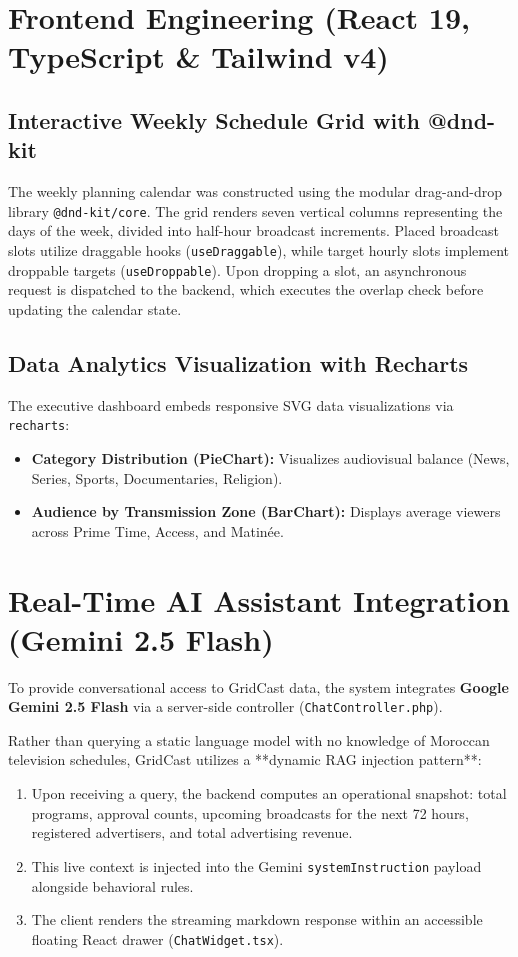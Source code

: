 \documentclass[12pt,a4paper,oneside]{report}
\begin{document}
\section{Frontend Engineering (React 19, TypeScript \& Tailwind v4)}

\subsection{Interactive Weekly Schedule Grid with @dnd-kit}
The weekly planning calendar was constructed using the modular drag-and-drop library \texttt{@dnd-kit/core}. The grid renders seven vertical columns representing the days of the week, divided into half-hour broadcast increments. Placed broadcast slots utilize draggable hooks (\texttt{useDraggable}), while target hourly slots implement droppable targets (\texttt{useDroppable}). Upon dropping a slot, an asynchronous request is dispatched to the backend, which executes the overlap check before updating the calendar state.

\subsection{Data Analytics Visualization with Recharts}
The executive dashboard embeds responsive SVG data visualizations via \texttt{recharts}:
\begin{itemize}
    \item \textbf{Category Distribution (PieChart):} Visualizes audiovisual balance (News, Series, Sports, Documentaries, Religion).
    \item \textbf{Audience by Transmission Zone (BarChart):} Displays average viewers across Prime Time, Access, and Matinée.
\end{itemize}

\section{Real-Time AI Assistant Integration (Gemini 2.5 Flash)}
To provide conversational access to GridCast data, the system integrates \textbf{Google Gemini 2.5 Flash} via a server-side controller (\texttt{ChatController.php}).

Rather than querying a static language model with no knowledge of Moroccan television schedules, GridCast utilizes a **dynamic RAG injection pattern**:
\begin{enumerate}
    \item Upon receiving a query, the backend computes an operational snapshot: total programs, approval counts, upcoming broadcasts for the next 72 hours, registered advertisers, and total advertising revenue.
    \item This live context is injected into the Gemini \texttt{systemInstruction} payload alongside behavioral rules.
    \item The client renders the streaming markdown response within an accessible floating React drawer (\texttt{ChatWidget.tsx}).
\end{enumerate}
\end{document}
